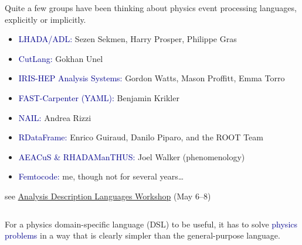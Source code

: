 \documentclass[aspectratio=169]{beamer}
\begin{document}
\begin{frame}{}
\large
\vspace{1.25 cm}
Quite a few groups have been thinking about physics event processing languages, explicitly or implicitly.

\vspace{0.25 cm}
\begin{itemize}
\item \textcolor{darkblue}{LHADA/ADL:} Sezen Sekmen, Harry Prosper, Philippe Gras
\item \textcolor{darkblue}{CutLang:} Gokhan Unel
\item \textcolor{darkblue}{IRIS-HEP Analysis Systems:} Gordon Watts, Mason Proffitt, Emma Torro
\item \textcolor{darkblue}{FAST-Carpenter (YAML):} Benjamin Krikler
\item \textcolor{darkblue}{NAIL:} Andrea Rizzi
\item \textcolor{darkblue}{RDataFrame:} Enrico Guiraud, Danilo Piparo, and the ROOT Team
\item \textcolor{darkblue}{AEACuS \& RHADAManTHUS:} Joel Walker (phenomenology)
\item \textcolor{darkblue}{Femtocode:} me, though not for several years\ldots
\end{itemize}

\vspace{0.25 cm}
\small \hfill see \textcolor{blue}{\href{https://indico.cern.ch/event/769263/timetable/}{Analysis Description Languages Workshop}} (May 6--8)
\end{frame}

\begin{frame}{}
\Large
\vspace{1.25 cm}
\begin{columns}
\begin{center}
For a physics domain-specific language (DSL) to be useful, it has to solve \textcolor{darkblue}{physics problems} in a way that is clearly simpler than the general-purpose language.

\vspace{1 cm}
\end{center}
\end{columns}
\end{frame}
\end{document}
